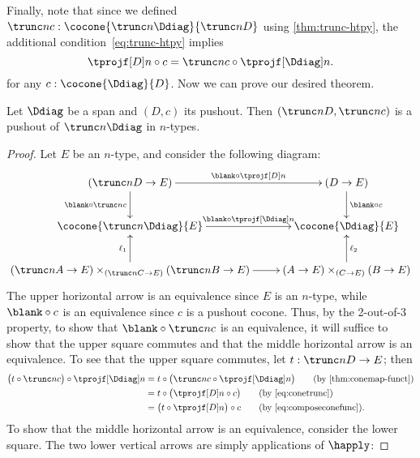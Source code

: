 Finally, note that since we defined $\trunc nc : \cocone{\trunc n \Ddiag}{\trunc n D}$ using \cref{thm:trunc-htpy}, the additional condition~\eqref{eq:trunc-htpy} implies
\begin{equation}
  \tprojf[D] n \circ c = \trunc n c \circ \tprojf[\Ddiag]n. \label{eq:conetrunc}
\end{equation}
for any $c:\cocone{\Ddiag}{D}$.
Now we can prove our desired theorem.

\begin{thm}
  \label{reflectcommutespushout}
  Let $\Ddiag$ be a span and $(D,c)$ its pushout.
  Then $(\trunc nD,\trunc n c)$ is a pushout of $\trunc n\Ddiag$ in $n$-types.
\end{thm}
\begin{proof}
  Let $E$ be an $n$-type, and consider the following diagram:
\bgroup
\def\reflect(#1){\trunc n{#1}}
  \begin{equation*}
  \vcenter{\xymatrix{
      (\trunc nD \to E)\ar[r]^-{\blank\circ \tprojf[D] n}\ar[d]_{\blank\circ \trunc nc} &
      (D\to E)\ar[d]^{\blank\circ c}\\
      \cocone{\trunc n \Ddiag}{E}\ar[r]^-{\blank\circ \tprojf[\Ddiag]n}\ar@{<-}[d]_{\ell_1} &
      \cocone{\Ddiag}{E}\ar@{<-}[d]^{\ell_2}\\
      (\reflect(A)\to{}E)\times_{(\reflect(C)\to{}E)}(\reflect(B)\to{}E)\ar[r] &
      (A\to{}E)\times_{(C\to{}E)}(B\to{}E)
      }}
  \end{equation*}
\egroup
  The upper horizontal arrow is an equivalence since $E$ is an $n$-type, while $\blank\circ c$ is an equivalence since $c$ is a pushout cocone.
  Thus, by the 2-out-of-3 property, to show that $\blank\circ \trunc nc$ is an equivalence, it will suffice to show that the upper square commutes and that the middle horizontal arrow is an equivalence.
  To see that the upper square commutes, let $t:\trunc nD \to E$; then
  \begin{align}
    \big(t \circ \trunc n c\big) \circ \tprojf[\Ddiag] n
    &= t \circ \big(\trunc n c \circ \tprojf[\Ddiag] n\big)
    \tag{by \cref{thm:conemap-funct}}\\
    &= t\circ \big(\tprojf[D]n \circ c\big)
    \tag{by~\eqref{eq:conetrunc}}\\
    &= \big(t\circ \tprojf[D]n\big) \circ c
    \tag{by~\eqref{eq:composeconefunc}}.
  \end{align}
  To show that the middle horizontal arrow is an equivalence, consider the lower square.
  The two lower vertical arrows are simply applications of $\happly$:

\end{proof}
